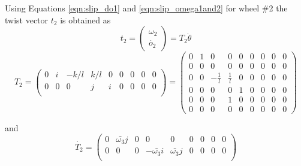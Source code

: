 {Using Equations \ref{eqn:slip_do1} and \ref{eqn:slip_omega1and2} for wheel \#2 the twist vector $t_2$  is obtained as 
\begin{equation}
\label{eqn:slip_t2}
t_2=
\begin{pmatrix}
\omega_2\\
\dot{o_2}
\end{pmatrix}=T_2 \dot{\theta}
\end{equation} 
\begin{equation}
\label{eqn:slip_T2}
T_2=
\begin{pmatrix}
0 & i& -k/l & k/l & 0 &0 & 0 &0 &0\\
0 & 0& 0& j &i &0 & 0 &0 &0\\ 
\end{pmatrix}=
\left(
\begin{array}{ccccccccc}
0 & 1 & 0 & 0 & 0 & 0 & 0 & 0 & 0 \\
0 & 0 & 0 & 0 & 0 & 0 & 0 & 0 & 0 \\
0 & 0 & -\frac{1}{l} & \frac{1}{l} & 0 & 0 & 0 & 0 & 0 \\
0 & 0 & 0 & 0 & 1 & 0 & 0 & 0 & 0 \\
0 & 0 & 0 & 1 & 0 & 0 & 0 & 0 & 0 \\
0 & 0 & 0 & 0 & 0 & 0 & 0 & 0 & 0
\end{array}
\right)
\end{equation}

and 
\begin{equation}
\label{eqn:slip_dT2}
\dot{T_2}=\begin{pmatrix}
0 & \bar{\omega_3}j & 0& 0 & 0 &0 & 0 &0 &0\\
0 & 0& 0& -\bar{\omega_3}i & \bar{\omega_3}j &0 & 0 &0 &0\\ 
\end{pmatrix}
\end{equation}


}
